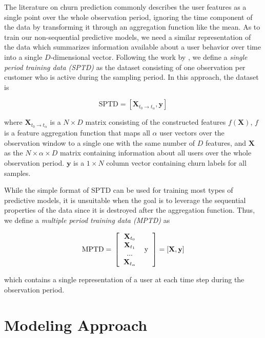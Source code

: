 \documentclass{kththesis}
\begin{document}
The literature on churn prediction commonly describes the user features as a single point over the whole observation period, ignoring the time component of the data by transforming it through an aggregation function like the mean. As to train our non-sequential predictive models, we need a similar representation of the data which summarizes information available about a user behavior over time into a single $D$-dimensional vector. Following the work by \citep{GurAli2014}, we define a \emph{single period training data (SPTD)} as the dataset consisting of one observation per customer who is active during the sampling period. In this approach, the dataset is 

\begin{equation}
\text{SPTD} = [\mathbf{X}_{t_0 \rightarrow t_\alpha}, \mathbf{y}]
\end{equation}

where $\mathbf{X}_{t_0\rightarrow t_\alpha}$ is a $N \times D$ matrix consisting of the constructed features $f(\mathbf{X})$, $f$ is a feature aggregation function that maps all $\alpha$ user vectors over the observation window to a single one with the same number of $D$ features, and  $\mathbf{X}$ as the $N \times \alpha \times D$ matrix containing information about all users over the whole observation period. $\mathbf{y}$ is a $1 \times N$ column vector containing churn labels for all samples. 

While the simple format of SPTD can be used for training most types of predictive models, it is unsuitable when the goal is to leverage the sequential properties of the data since it is destroyed after the aggregation function. Thus, we define a \emph{multiple period training data (MPTD)} as

\begin{equation}
\text{MPTD} = \\
\left [  
  \begin{tabular}{c c}
   $\mathbf{X}_{t_0}$   & \multirow{4}{*}{y} \\
   $\mathbf{X}_{t_1}$ \\
   ... \\
  $\mathbf{X}_{t_\alpha}$ \\
  \end{tabular}
\right ]
= [\mathbf{X}, \mathbf{y}]
\end{equation}

which contains a single representation of a user at each time step during the observation period.

\section{Modeling Approach}
\end{document}
